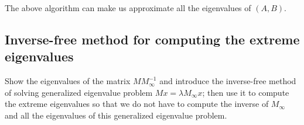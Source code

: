 The above algorithm can make us approximate all the eigenvalues of $(A,B)$.

\subsection{Inverse-free method for computing the extreme eigenvalues}
{\color{blue}Show the eigenvalues of the matrix $MM_{\infty}^{-1}$ and introduce the inverse-free method of solving generalized eigenvalue problem 
$Mx = \lambda M_{\infty}x$; then use it to compute the extreme eigenvalues so that we do not have to compute the inverse of $M_{\infty}$ and 
all the eigenvalues of this generalized eigenvalue problem.}